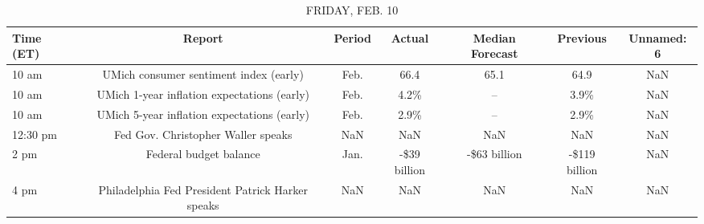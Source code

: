 \documentclass{article}%
\begin{document}
%


\begin{table}[htbp]%
\caption{FRIDAY, FEB. 10}%
\centering%
\begin{adjustbox}{width=1\textwidth}%
\begin{tabular}{lcccccc}
\toprule
Time (ET) &                                           Report & Period &       Actual & Median Forecast &      Previous & Unnamed: 6 \\
\midrule
    10 am &           UMich consumer sentiment index (early) &   Feb. &         66.4 &            65.1 &          64.9 &        NaN \\
    10 am &      UMich 1-year inflation expectations (early) &   Feb. &         4.2\% &              -- &          3.9\% &        NaN \\
    10 am &      UMich 5-year inflation expectations (early) &   Feb. &         2.9\% &              -- &          2.9\% &        NaN \\
 12:30 pm &               Fed Gov. Christopher Waller speaks &    NaN &          NaN &             NaN &           NaN &        NaN \\
     2 pm &                           Federal budget balance &   Jan. & -\$39 billion &    -\$63 billion & -\$119 billion &        NaN \\
     4 pm & Philadelphia Fed President Patrick Harker speaks &    NaN &          NaN &             NaN &           NaN &        NaN \\
\bottomrule
\end{tabular}
%
\end{adjustbox}%
\end{table}
\end{document}
